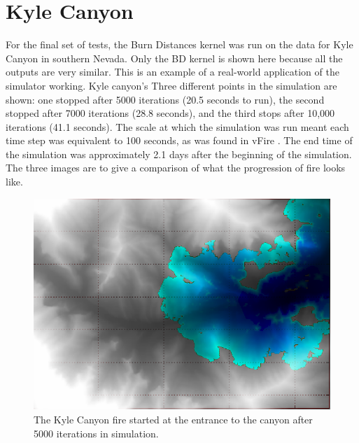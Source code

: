 \section{Kyle Canyon}
For the final set of tests, the Burn Distances kernel was run on the data for Kyle Canyon in southern Nevada. Only the BD kernel is shown here because all the outputs are very similar. This is an example of a real-world application of the simulator working. Kyle canyon's  Three different points in the simulation are shown: one stopped after 5000 iterations (20.5 seconds to run), the second stopped after 7000 iterations (28.8 seconds), and the third stops after 10,000 iterations (41.1 seconds). The scale at which the simulation was run meant each time step was equivalent to 100 seconds, as was found in vFire \cite{vFire}. The end time of the simulation was approximately 2.1 days after the beginning of the simulation. The three images are to give a comparison of what the progression of fire looks like. 
\begin{figure}%
\centering
  \includegraphics[height=.4\textheight]{figures/results/overlay_5.png}
  \caption{The Kyle Canyon fire started at the entrance to the canyon after 5000 iterations in simulation.}
  \label{fig:kyle_5000}
\end{figure}  
